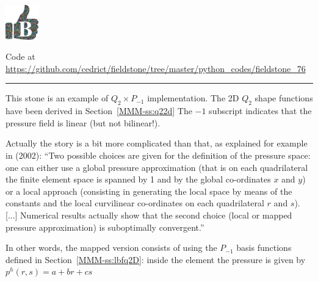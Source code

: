 \includegraphics[height=1.5cm]{images/pictograms/benchmark}



\begin{center}
Code at \url{https://github.com/cedrict/fieldstone/tree/master/python_codes/fieldstone_76}
\end{center}

\par\noindent\rule{\textwidth}{0.4pt}



This stone is an example of $Q_2\times P_{-1}$ implementation. 
The 2D $Q_2$ shape functions have been derived in Section~\ref{MMM-ss:q22d}
The $-1$ subscript indicates that the pressure field is linear (but not bilinear!).

Actually the story is a bit more complicated than that, as explained for 
example in \textcite{boga02} (2002):
``Two possible choices are given for the definition of the pressure space: 
one can either use a global pressure approximation (that is on
each quadrilateral the finite element space is spanned by 1 and by the global co-ordinates $x$ and $y$)
or a local approach (consisting in generating the local space by means of the constants and the local
curvilinear co-ordinates on each quadrilateral $r$ and $s$). [...] Numerical results actually show
that the second choice (local or mapped pressure approximation) is suboptimally convergent.'' 

In other words, the mapped version consists of  
using the $P_{-1}$ basis functions defined in Section~\ref{MMM-ss:lbfq2D}:
inside the element the pressure is given by $p^h(r,s)=a+br+cs$ 

